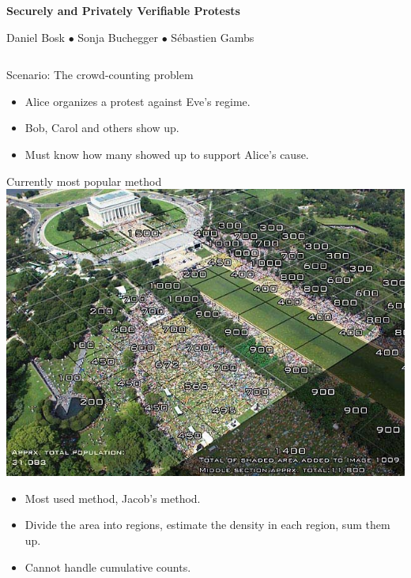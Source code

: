 \begin{center}
  \Huge\bfseries
  Securely and Privately Verifiable Protests
\end{center}
\begin{center}
  \large
  Daniel Bosk $\bullet$ Sonja Buchegger $\bullet$ Sébastien Gambs
\end{center}
\vspace{1.5em}

\begin{columns}[t]

  \begin{column}{0.32\linewidth}

    \begin{blueblock}{Scenario: The crowd-counting problem}
      \begin{itemize}
        \item Alice organizes a protest against Eve's regime.
        \item Bob, Carol and others show up.
        \item Must know how many showed up to support Alice's cause.
      \end{itemize}
    \end{blueblock}

    \begin{orangeblock}{Currently most popular method}
      \centering
      \includegraphics[width=0.9\linewidth]{fig/Jacobs-method.jpg}
      \begin{itemize}
        \item Most used method, Jacob's method.
        \item Divide the area into regions, estimate the density in each 
          region, sum them up.
        \item \color{red} Cannot handle cumulative counts.
      \end{itemize}
    \end{orangeblock}


\end{column}
\end{columns}
